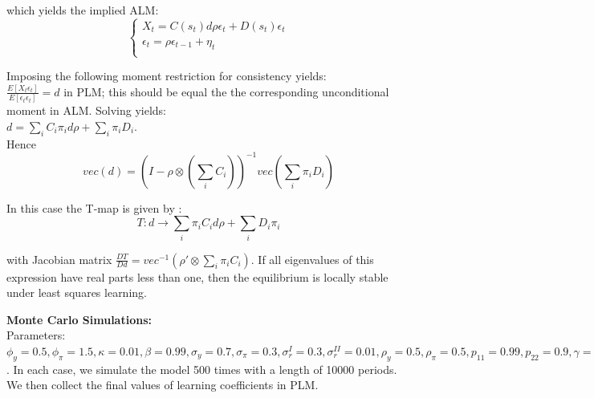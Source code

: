 \documentclass[12pt,reqno]{article}
\numberwithin{equation}{section}
\begin{document}
which yields the implied ALM:\\

$$
\begin{cases}
X_t = C(s_t) d \rho \epsilon_t+ D(s_t) \epsilon_t \\
\epsilon_t = \rho \epsilon_{t-1} + \eta_t \\
\end{cases}
$$

Imposing the following moment restriction for consistency yields: \\

$ \frac{ E[X_t \epsilon_t]}{E[\epsilon_t \epsilon_t]}= d  $  in PLM; this should be equal the the corresponding unconditional moment in ALM. Solving yields: \\

$ d = \sum_i C_i \pi_i d \rho + \sum_i \pi_i D_i $. \\

Hence 
$$ vec(d) = (I-\rho \otimes (\sum_i C_i))^{-1} vec(\sum_i \pi_i D_i ) $$

In this case the T-map is given by : \\

$$ T : d \rightarrow \sum_i \pi_i C_i d \rho + \sum_i D_i \pi_i $$

with Jacobian matrix  $ \frac{DT }{D d} = vec^{-1}(\rho' \otimes \sum_i \pi_i C_i) $. If all eigenvalues of this expression have real parts less than one, then the equilibrium is locally stable under least squares learning. 

\newpage 

\textbf{Monte Carlo Simulations: } \\

Parameters: $\phi_y =0.5, \phi_{\pi}=1.5, \kappa=0.01, \beta=0.99, \sigma_y = 0.7, \sigma_{\pi} =0.3, \sigma^{I}_r =0.3, \sigma^{II}_r=0.01,\rho_y =0.5, \rho_{\pi}=0.5 , p_{11} = 0.99, p_{22} = 0.9, \gamma = 0.01$. In each case, we simulate the model 500 times with a length of 10000 periods. We then collect the final values of learning coefficients in PLM. \\
\end{document}
